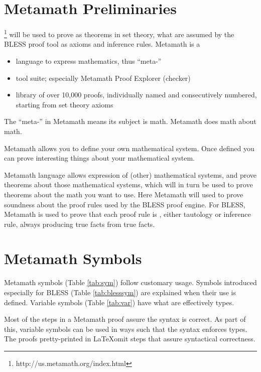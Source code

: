 
\section{Metamath Preliminaries}\label{sec:metamathprelim}

\footnote{http://us.metamath.org/index.html} will be used to prove as theorems in set theory, what are assumed by the BLESS proof tool as axioms and inference rules.  Metamath is a
\begin{itemize}
  \item language to express mathematics, thus ``meta-''
  \item tool suite; especially Metamath Proof Explorer (checker)
  \item library of over 10,000 proofs, individually named and consecutively numbered, starting from set theory axioms 
\end{itemize}


The ``meta-'' in Metamath means its subject is math.  Metamath does math about math.  

Metamath allows you to define your own mathematical system.  Once defined you can prove interesting things about your mathematical system.

Metamath language allows expression of (other) mathematical systems, and prove theorems about those mathematical systems, which will in turn be used to prove theorems about the math you want to use.  Here Metamath will used to prove soundness about the proof rules used by the BLESS proof engine.  For BLESS, Metamath is used to prove that each proof rule is , either tautology or inference rule, always producing true facts from true facts.

\section{Metamath Symbols}\label{sec:metamathsymbols}

Metamath symbols (Table \ref{tab:sym}) follow customary usage.  Symbols introduced especially for BLESS (Table \ref{tab:blesssym}) are explained when their use is defined.  Variable symbols (Table \ref{tab:var}) have what are effectively types.

Most of the steps in a Metamath proof assure the syntax is correct.  As part of this, variable symbols can be used in ways such that the syntax enforces types.  The proofs pretty-printed in \LaTeX omit steps that assure syntactical correctness.

